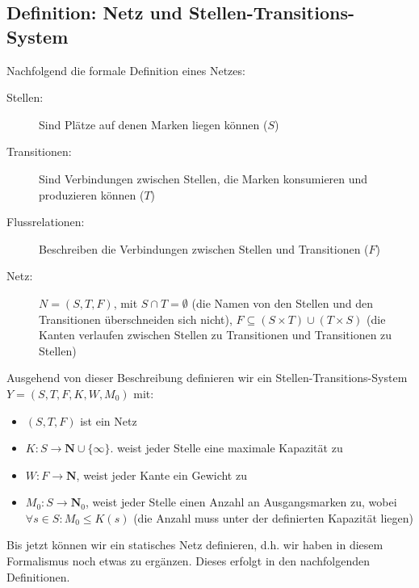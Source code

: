 \documentclass[11pt, fleqn, a4paper, leqno]{scrartcl} %
\begin{document}
	\subsection{Definition: Netz und Stellen-Transitions-System}
		Nachfolgend die formale Definition eines Netzes: 
		\begin{description}
			\item[Stellen:] Sind Plätze auf denen Marken liegen können ($S$)
			\item[Transitionen:] Sind Verbindungen zwischen Stellen, die Marken konsumieren und produzieren können ($T$)
			\item[Flussrelationen:] Beschreiben die Verbindungen zwischen Stellen und Transitionen ($F$)
			\item[Netz:] $N=(S,T,F)$, mit $S \cap T = \emptyset$ (die Namen von den Stellen und den Transitionen überschneiden sich nicht), $F \subseteq (S \times T) \cup (T \times S)$ (die Kanten verlaufen zwischen Stellen zu Transitionen und Transitionen zu Stellen)
		\end{description}
		Ausgehend von dieser Beschreibung definieren wir ein Stellen-Transitions-System\\
		$Y=(S,T,F,K,W,M_{0})$ mit:
		\begin{itemize}
			\item $(S,T,F)$ ist ein Netz
			\item $K: S \rightarrow \mathbf{N} \cup \{\infty\}$. weist jeder Stelle eine maximale Kapazität zu
			\item $W: F \rightarrow \mathbf{N}$, weist jeder Kante ein Gewicht zu
			\item $M_{0}: S \rightarrow \mathbf{N}_{0}$, weist jeder Stelle einen Anzahl an Ausgangsmarken zu, wobei $\forall s \in S : M_{0} \leq K(s)$ (die Anzahl muss unter der definierten Kapazität liegen)
		\end{itemize}
		Bis jetzt können wir ein statisches Netz definieren, d.h. wir haben in diesem Formalismus noch etwas zu ergänzen. Dieses erfolgt in den nachfolgenden Definitionen.
\end{document}
